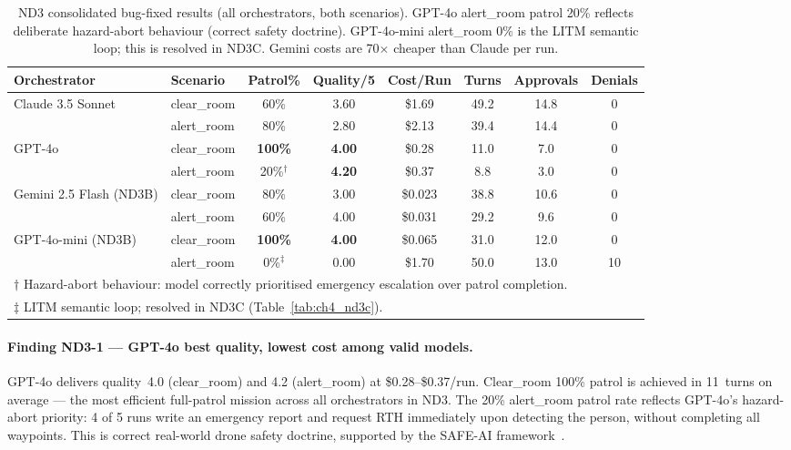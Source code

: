\begin{table}[ht]
  \caption{ND3 consolidated bug-fixed results (all orchestrators, both scenarios).
    GPT-4o alert\_room patrol 20\% reflects deliberate hazard-abort behaviour (correct
    safety doctrine).  GPT-4o-mini alert\_room 0\% is the LITM semantic loop;
    this is resolved in ND3C.  Gemini costs are 70$\times$ cheaper than Claude per run.}
  \label{tab:ch4_nd3b}
  \centering
  \small
  \begin{tabular}{llcccccc}
    \toprule
    Orchestrator & Scenario & Patrol\% & Quality/5 & Cost/Run & Turns & Approvals & Denials \\
    \midrule
    \multirow{2}{*}{Claude 3.5 Sonnet}
      & clear\_room & 60\%   & 3.60 & \$1.69 & 49.2 & 14.8 & 0 \\
      & alert\_room & 80\%   & 2.80 & \$2.13 & 39.4 & 14.4 & 0 \\
    \midrule
    \multirow{2}{*}{GPT-4o}
      & clear\_room & \textbf{100\%} & \textbf{4.00} & \$0.28 & 11.0 & 7.0 & 0 \\
      & alert\_room & 20\%$^\dagger$ & \textbf{4.20} & \$0.37 & 8.8  & 3.0 & 0 \\
    \midrule
    \multirow{2}{*}{Gemini 2.5 Flash (ND3B)}
      & clear\_room & 80\%   & 3.00 & \$0.023 & 38.8 & 10.6 & 0 \\
      & alert\_room & 60\%   & 4.00 & \$0.031 & 29.2 & 9.6  & 0 \\
    \midrule
    \multirow{2}{*}{GPT-4o-mini (ND3B)}
      & clear\_room & \textbf{100\%} & \textbf{4.00} & \$0.065 & 31.0 & 12.0 & 0 \\
      & alert\_room & 0\%$^\ddagger$ & 0.00 & \$1.70 & 50.0 & 13.0 & 10 \\
    \bottomrule
    \multicolumn{8}{l}{\footnotesize $\dagger$ Hazard-abort behaviour: model correctly
      prioritised emergency escalation over patrol completion.} \\
    \multicolumn{8}{l}{\footnotesize $\ddagger$ LITM semantic loop; resolved in ND3C
      (Table~\ref{tab:ch4_nd3c}).}
  \end{tabular}
\end{table}

\paragraph{Finding ND3-1 --- GPT-4o best quality, lowest cost among valid models.}
GPT-4o delivers quality~4.0 (clear\_room) and 4.2 (alert\_room) at \$0.28--\$0.37/run.
Clear\_room 100\% patrol is achieved in 11~turns on average --- the most efficient
full-patrol mission across all orchestrators in ND3.  The 20\% alert\_room patrol rate
reflects GPT-4o's hazard-abort priority: 4 of 5 runs write an emergency report and
request RTH immediately upon detecting the person, without completing all waypoints.  This
is correct real-world drone safety doctrine, supported by the SAFE-AI
framework~\cite{sanneman2022safeai}.

